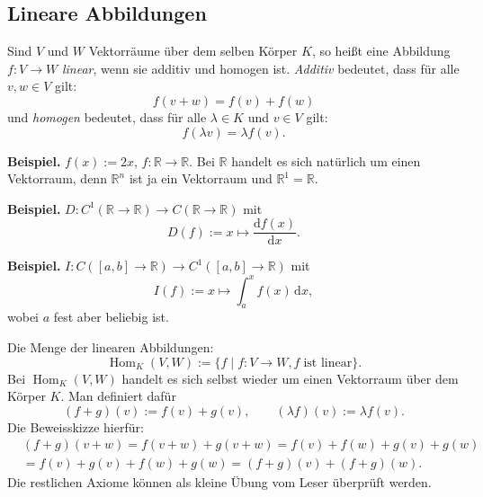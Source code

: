 \documentclass[a4paper,11pt,fleqn,twoside]{scrartcl}
\numberwithin{equation}{section}
\newcommand{\R}{\mathbb R}
\newcommand{\strong}[1]{{\normalfont\sffamily\bfseries #1}}
\newenvironment{Definition}{\par\noindent\strong{Definition.}}{\par}
\begin{document}
\subsection{Lineare Abbildungen}

\begin{Definition}
Sind $V$ und $W$ Vektorräume über dem selben Körper $K$, so heißt
eine Abbildung $f\colon V\to W$ \emph{linear}, wenn sie additiv
und homogen ist. \emph{Additiv} bedeutet, dass für alle $v,w\in V$
gilt:
\begin{equation}
f(v+w) = f(v)+f(w)
\end{equation}
und \emph{homogen} bedeutet, dass für alle $\lambda\in K$ und $v\in V$
gilt:
\begin{equation}
f(\lambda v) = \lambda f(v).
\end{equation}
\end{Definition}

\strong{Beispiel.} $f(x):=2x$, $f\colon\R\to\R$. Bei $\R$ handelt
es sich natürlich um einen Vektorraum, denn $\R^n$ ist ja ein
Vektorraum und $\R^1=\R$.

\strong{Beispiel.} $D\colon C^1(\R\to\R)\to C(\R\to\R)$ mit
\begin{equation}
D(f):=x\mapsto\frac{\mathrm df(x)}{\mathrm dx}.
\end{equation}

\strong{Beispiel.} $I\colon C([a,b]\to\R)\to C^1([a,b]\to\R)$ mit
\begin{equation}
I(f):=x\mapsto\int_a^x f(x)\,\mathrm dx,
\end{equation}
wobei $a$ fest aber beliebig ist.

Die Menge der linearen Abbildungen:
\begin{equation}
\operatorname{Hom}_K(V,W)
:= \{f\mid f\colon V\to W, f\;\text{ist linear}\}.
\end{equation}
Bei $\operatorname{Hom}_K(V,W)$ handelt es sich selbst wieder
um einen Vektorraum über dem Körper $K$. Man definiert dafür
\begin{equation}
(f+g)(v) := f(v)+g(v),\qquad
(\lambda f)(v) := \lambda f(v).
\end{equation}
Die Beweisskizze hierfür:
\[\begin{split}
&(f+g)(v+w) = f(v+w)+g(v+w) = f(v)+f(w)+g(v)+g(w)\\
&= f(v)+g(v)+f(w)+g(w) = (f+g)(v)+(f+g)(w).
\end{split}\]
Die restlichen Axiome können als kleine Übung vom Leser
überprüft werden.
\end{document}
